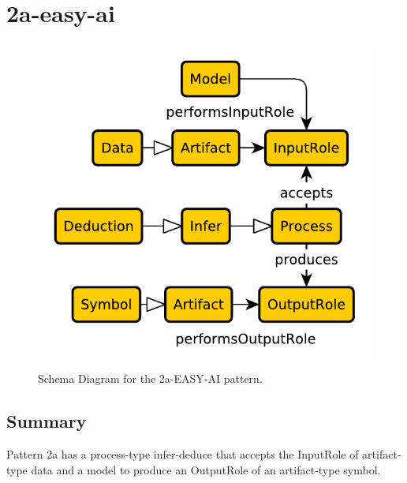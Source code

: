\section{2a-easy-ai}
\label{sec:2a}
\begin{figure}[h!]
\begin{center}
\includegraphics[width=.8\textwidth]{images/schema-diagrams/2a-elementary-pattern.pdf}
\end{center}
\caption{Schema Diagram for the 2a-EASY-AI pattern. %
}
\label{fig:nen-accepts}
\end{figure}
\subsection{Summary}
Pattern 2a has a process-type infer-deduce that accepts the InputRole of artifact-type data and a model to produce an OutputRole of an artifact-type symbol.
\label{sum:2a}

